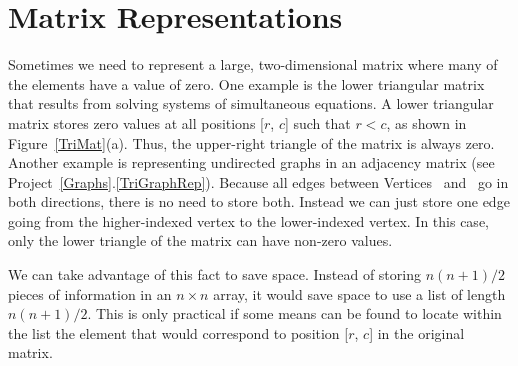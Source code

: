 \section{Matrix Representations}
\label{SparseMatrix}

Sometimes we need to represent a large, two-dimensional matrix
where many of the elements have a value of zero.
One example is the lower triangular matrix that results from solving
systems of simultaneous equations.
A lower triangular matrix stores zero values at all positions
[$r$, $c$] such that $r<c$, as shown in Figure~\ref{TriMat}(a).
Thus, the upper-right triangle of the matrix is always zero.
Another example is representing undirected
graphs in an
adjacency matrix
(see Project~\ref{Graphs}.\ref{TriGraphRep}).
Because all edges between Vertices~ and~ go in both
directions, there is no need to store both.
Instead we can just store one edge going from the higher-indexed
vertex to the lower-indexed vertex.
In this case, only the lower triangle of the matrix can have non-zero
values.

We can take advantage of this fact to save space.
Instead of storing $n(n+1)/2$ pieces of information in an
$n \times n$ array, it would save space to use a list of length
$n(n+1)/2$.
This is only practical if some means can be found to locate within the
list the element that would correspond to position [$r$, $c$] in the
original matrix.

